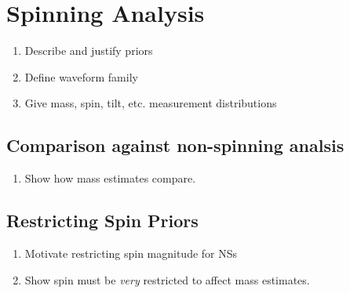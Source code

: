 \section{Spinning Analysis}

\begin{enumerate}
\item Describe and justify priors
\item Define waveform family
\item Give mass, spin, tilt, etc. measurement distributions
\end{enumerate}


\subsection{Comparison against non-spinning analsis}

\begin{enumerate}
\item Show how mass estimates compare.
\end{enumerate}


\subsection{Restricting Spin Priors}

\begin{enumerate}
\item Motivate restricting spin magnitude for NSs
\item Show spin must be \textit{very} restricted to affect mass estimates.
\end{enumerate}